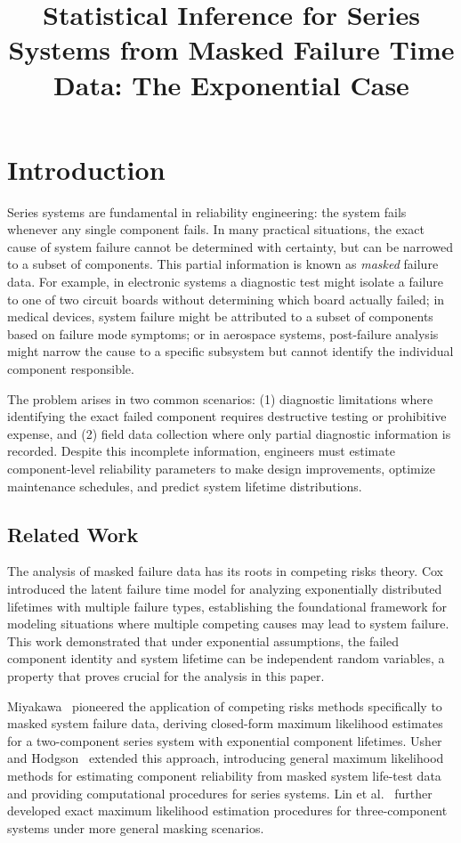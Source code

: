 \documentclass[pdflatex,sn-mathphys-num,Numbered]{sn-jnl}
\title[Article Title]{Statistical Inference for Series Systems from Masked Failure Time Data: The Exponential Case}
\author*[1]{\fnm{Alexander} \sur{Towell}}\email{lex@metafunctor.com}
\affil*[1]{\orgdiv{Cooperative Ph.D.\ Program in Computer Science}, \orgname{Southern Illinois University}, \orgaddress{\city{Edwardsville/Carbondale}, \state{IL}, \country{USA}}}
\theoremstyle{thmstyleone}
\theoremstyle{thmstylethree}
\theoremstyle{thmstyletwo}
\begin{document}
\maketitle

\section{Introduction}
\label{sec:intro}

Series systems are fundamental in reliability engineering: the system fails whenever any single component fails. In many practical situations, the exact cause of system failure cannot be determined with certainty, but can be narrowed to a subset of components. This partial information is known as \emph{masked} failure data. For example, in electronic systems a diagnostic test might isolate a failure to one of two circuit boards without determining which board actually failed; in medical devices, system failure might be attributed to a subset of components based on failure mode symptoms; or in aerospace systems, post-failure analysis might narrow the cause to a specific subsystem but cannot identify the individual component responsible.

The problem arises in two common scenarios: (1) diagnostic limitations where identifying the exact failed component requires destructive testing or prohibitive expense, and (2) field data collection where only partial diagnostic information is recorded. Despite this incomplete information, engineers must estimate component-level reliability parameters to make design improvements, optimize maintenance schedules, and predict system lifetime distributions.

\subsection{Related Work}

The analysis of masked failure data has its roots in competing risks theory. Cox~\cite{cox1959} introduced the latent failure time model for analyzing exponentially distributed lifetimes with multiple failure types, establishing the foundational framework for modeling situations where multiple competing causes may lead to system failure. This work demonstrated that under exponential assumptions, the failed component identity and system lifetime can be independent random variables, a property that proves crucial for the analysis in this paper.

Miyakawa~\cite{miyakawa1984} pioneered the application of competing risks methods specifically to masked system failure data, deriving closed-form maximum likelihood estimates for a two-component series system with exponential component lifetimes. Usher and Hodgson~\cite{usher1988} extended this approach, introducing general maximum likelihood methods for estimating component reliability from masked system life-test data and providing computational procedures for series systems. Lin et al.~\cite{exactmle} further developed exact maximum likelihood estimation procedures for three-component systems under more general masking scenarios.
\end{document}
